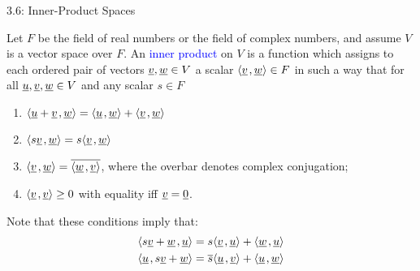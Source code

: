 \documentclass[10pt,english,aspectratio=169]{beamer}
\begin{document}
\begin{frame}{3.6: Inner-Product Spaces}
\begin{definition} \label{definition:InnerProduct}
Let $F$ be the field of real numbers or the field of complex numbers, and assume $V$ is a vector space over $F$.
An \textcolor{blue}{inner product} on $V$ is a function which assigns to each ordered pair of vectors $\underline{v}, \underline{w} \in V$ a scalar ${\left\langle  \underline{v}  \mskip2mu ,  \underline{w}  \right\rangle} \in F$ in such a way that for all $\underline{u}, \underline{v}, \underline{w} \in V$ and any scalar $s \in F$
\begin{enumerate}
\item ${\left\langle  \underline{u} + \underline{v}  \mskip2mu ,  \underline{w}  \right\rangle}
= {\left\langle  \underline{u}  \mskip2mu ,  \underline{w}  \right\rangle}
+ {\left\langle  \underline{v}  \mskip2mu ,  \underline{w}  \right\rangle}$
\item ${\left\langle  s \underline{v}  \mskip2mu ,  \underline{w}  \right\rangle}
= s {\left\langle  \underline{v}  \mskip2mu ,  \underline{w}  \right\rangle}$
\item ${\left\langle  \underline{v}  \mskip2mu ,  \underline{w}  \right\rangle}
= \overline{ {\left\langle  \underline{w}  \mskip2mu ,  \underline{v}  \right\rangle} }$, where the overbar denotes complex conjugation;
\item ${\left\langle  \underline{v}  \mskip2mu ,  \underline{v}  \right\rangle} \geq 0$ with equality iff $\underline{v} = \underline{0}$.
\end{enumerate}
\end{definition}

\vspace{2mm}
Note that these conditions imply that:
\begin{align*}
{\left\langle  s \underline{v} + \underline{w}  \mskip2mu ,  \underline{u}   \right\rangle}
&= s {\left\langle  \underline{v}  \mskip2mu ,  \underline{u}  \right\rangle}
+ {\left\langle  \underline{w}  \mskip2mu ,  \underline{u}  \right\rangle} \\
{\left\langle  \underline{u}  \mskip2mu ,  s \underline{v} + \underline{w}  \right\rangle}
&= \overline{s} {\left\langle  \underline{u}  \mskip2mu ,  \underline{v}  \right\rangle}
+ {\left\langle  \underline{u}  \mskip2mu ,  \underline{w}  \right\rangle}
\end{align*}
\end{frame}
\end{document}
